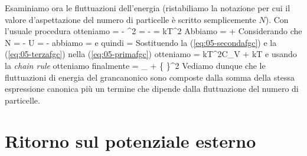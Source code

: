 Esaminiamo ora le fluttuazioni dell'energia (ristabiliamo la notazione per cui il valore d'aspettazione del numero di particelle è scritto semplicemente $N$). Con l'usuale procedura otteniamo
\be
\label{eq:05-primafgc}
 =  - ^2 = - = kT^2
\ee
Abbiamo
\be
\label{eq:05-secondafgc}
 =  + 
\ee
Considerando che
\be
N = - \quad\quad\quad U = -
\ee
abbiamo
\be
{} = 
\ee
e quindi
\be
\label{eq:05-terzafgc}
 = 
\ee
Sostituendo la (\ref{eq:05-secondafgc}) e la (\ref{eq:05-terzafgc}) nella (\ref{eq:05-primafgc}) otteniamo
\be
{} = kT^2C_V + kT
\ee
e usando la {\em chain rule} otteniamo finalmente
\be
{} = _{} +
\left\{
\right\}^2 
\ee
Vediamo dunque che le fluttuazioni di energia del grancanonico sono composte dalla somma della stessa espressione canonica più un termine che dipende dalla fluttuazione del numero di particelle.

\section{Ritorno sul potenziale esterno}
\label{sec:05-potesternoGC}

